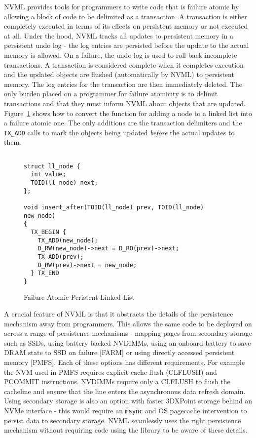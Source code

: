 \documentclass[twocolumn]{article}
\begin{document}
NVML provides tools for programmers to write code that is failure
atomic by allowing a block of code to be delimited as a transaction. A
transaction is either completely executed in terms of its effects on
persistent memory or not executed at all. Under the hood, NVML tracks all
updates to persistent memory in a persistent undo log - the log entries are
persisted before the update to the actual memory is allowed. On a failure, the
undo log is used to roll back incomplete transactions. A transaction is
considered complete when it completes execution and the updated objects are
flushed (automatically by NVML) to persistent memory. The log entries for the
transaction are then immediately deleted. The only burden placed on a programmer
for failure atomicity is to delimit transactions and that they must inform NVML
about objects that are updated. Figure~\ref{fig:example_fatomic} shows how to
convert the function for adding a node to a linked list into a failure atomic
one. The only additions are the transaction delimiters and the {\tt TX\_ADD}
calls to mark the objects being updated \emph{before} the actual updates to
them.

\begin{figure}
{ \scriptsize
\begin{verbatim}

struct ll_node {
  int value;
  TOID(ll_node) next;
};

void insert_after(TOID(ll_node) prev, TOID(ll_node) new_node)
{
  TX_BEGIN {
    TX_ADD(new_node);
    D_RW(new_node)->next = D_RO(prev)->next;
    TX_ADD(prev);
    D_RW(prev)->next = new_node;
  } TX_END
}

\end{verbatim}
}
\caption{Failure Atomic Peristent Linked List}
\label{fig:example_fatomic}
\end{figure}

A crucial feature of NVML is that it abstracts the details of the persistence
mechanism away from programmers. This allows the same code to be deployed on
across a range of persistence mechanisms - mapping pages from secondary
storage such as SSDs, using battery backed NVDIMMs, using an onboard battery to
save DRAM state to SSD on failure [FARM] or using directly accessed persistent
memory [PMFS]. Each of these options has different requirements. For example the
NVM used in PMFS requires explicit cache flush (CLFLUSH) and PCOMMIT
instructions. NVDIMMs require only a CLFLUSH to flush the
cacheline and ensure that the line enters the asynchronous data refresh
domain. Using secondary storage is also an option with faster 3DXPoint storage
behind an NVMe interface - this would require an {\tt msync} and OS pagecache
intervention to persist data to secondary storage. NVML seamlessly uses the
right persistence mechanism without requiring code using the library to be aware
of these details.
\end{document}
